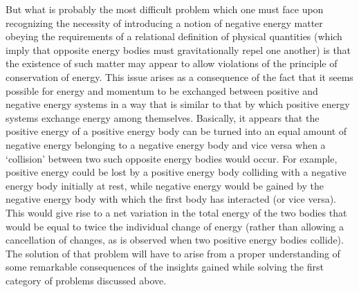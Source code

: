 \documentclass[notitlepage,12pt]{report}
\begin{document}
But what is probably the most difficult problem which one must face upon recognizing the necessity of introducing a notion of negative energy matter obeying the requirements of a relational definition of physical quantities (which imply that opposite energy bodies must gravitationally repel one another) is that the existence of such matter may appear to allow violations of the principle of conservation of energy. This issue arises as a consequence of the fact that it seems possible for energy and momentum to be exchanged between positive and negative energy systems in a way that is similar to that by which positive energy systems exchange energy among themselves. Basically, it appears that the positive energy of a positive energy body can be turned into an equal amount of negative energy belonging to a negative energy body and vice versa when a `collision' between two such opposite energy bodies would occur. For example, positive energy could be lost by a positive energy body colliding with a negative energy body initially at rest, while negative energy would be gained by the negative energy body with which the first body has interacted (or vice versa). This would give rise to a net variation in the total energy of the two bodies that would be equal to twice the individual change of energy (rather than allowing a cancellation of changes, as is observed when two positive energy bodies collide). The solution of that problem will have to arise from a proper understanding of some remarkable consequences of the insights gained while solving the first category of problems discussed above.
\end{document}
